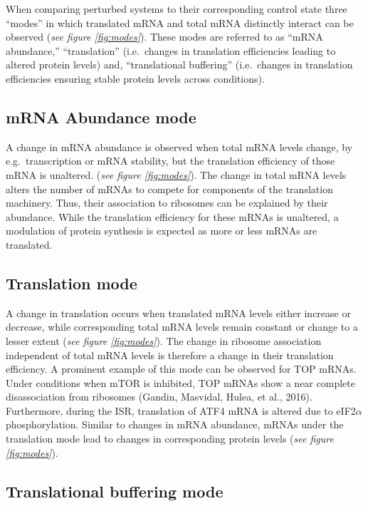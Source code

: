 \documentclass[
  12pt,
  openany]{book}
\begin{document}
When comparing perturbed systems to their corresponding control state three ``modes'' in which translated mRNA and total mRNA distinctly interact can be observed (\emph{see figure \ref{fig:modes}}). These modes are referred to as ``mRNA abundance,'' ``translation'' (i.e.~changes in translation efficiencies leading to altered protein levels) and, ``translational buffering'' (i.e.~changes in translation efficiencies ensuring stable protein levels across conditions).

\subsection{mRNA Abundance mode}

A change in mRNA abundance is observed when total mRNA levels change, by e.g.~transcription or mRNA stability, but the translation efficiency of those mRNA is unaltered. (\emph{see figure \ref{fig:modes}}). The change in total mRNA levels alters the number of mRNAs to compete for components of the translation machinery. Thus, their association to ribosomes can be explained by their abundance. While the translation efficiency for these mRNAs is unaltered, a modulation of protein synthesis is expected as more or less mRNAs are translated.

\subsection{Translation mode}

A change in translation occurs when translated mRNA levels either increase or decrease, while corresponding total mRNA levels remain constant or change to a lesser extent (\emph{see figure \ref{fig:modes}}). The change in ribosome association independent of total mRNA levels is therefore a change in their translation efficiency. A prominent example of this mode can be observed for TOP mRNAs. Under conditions when mTOR is inhibited, TOP mRNAs show a near complete disassociation from ribosomes (Gandin, Masvidal, Hulea, et al., 2016). Furthermore, during the ISR, translation of ATF4 mRNA is altered due to eIF2\(\alpha\) phosphorylation. Similar to changes in mRNA abundance, mRNAs under the translation mode lead to changes in corresponding protein levels (\emph{see figure \ref{fig:modes}}).

\subsection{Translational buffering mode} \label{modeBuffering}
\end{document}
